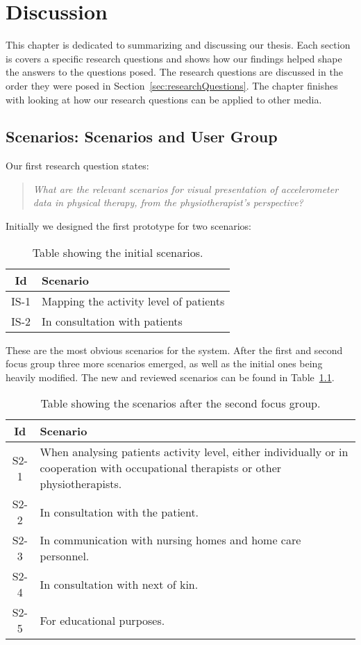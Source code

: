\chapter{Discussion}
\label{ch:discussion}
This chapter is dedicated to summarizing and discussing our thesis. Each section is covers a specific research questions and shows how our findings helped shape the answers to the questions posed. The research questions are discussed in the order they were posed in Section~\ref{sec:researchQuestions}. The chapter finishes with looking at how our research questions can be applied to other media.

\section{Scenarios: Scenarios and User Group}
Our first research question states:
\begin{quote}
\textit{What are the relevant scenarios for visual presentation of accelerometer data in physical therapy, from the physiotherapist's perspective?}
\end{quote}

Initially we designed the first prototype for two scenarios:
\begin{table}[h!]
  \begin{tabular}{|c|p{10cm}|}
    \hline
    \textbf{Id} & \textbf{Scenario} \\ \hline
    IS-1 & Mapping the activity level of patients \\ \hline
    IS-2 & In consultation with patients \\ \hline
  \end{tabular}
  \caption{Table showing the initial scenarios.}
\end{table}

These are the most obvious scenarios for the system. After the first and second focus group three more scenarios emerged, as well as the initial ones being heavily modified. The new and reviewed scenarios can be found in Table~\ref{tab:scenariosFinal1}.

\begin{table}[h!]
  \begin{tabular}{|c|p{10cm}|}
    \hline
    \textbf{Id} & \textbf{Scenario} \\ \hline
    S2-1 & When analysing patients activity level, either individually or in cooperation with occupational therapists or other physiotherapists. \\ \hline
    S2-2 & In consultation with the patient. \\ \hline
    S2-3 & In communication with nursing homes and home care personnel. \\ \hline
    S2-4 & In consultation with next of kin. \\ \hline
    S2-5 & For educational purposes. \\ \hline
  \end{tabular}
  \caption{Table showing the scenarios after the second focus group.}
  \label{tab:scenariosFinal1}
\end{table}

